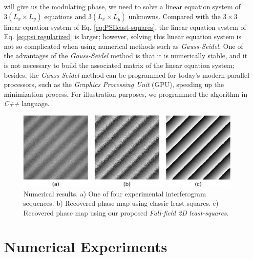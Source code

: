 will give us the modulating phase, we need to solve a linear equation
system of $3(L_x\times L_y)$ equations and $3(L_x\times L_y)$
unknowns. Compared with the $3\times 3$ linear equation system of
Eq. \eqref{eq:PSIleast-squares}, the linear equation system of
Eq. \eqref{eq:psi regularized} is larger; however, solving this
linear equation system is not so complicated when using numerical
methods such as \emph{Gauss-Seidel}. One of the advantages of
the \emph{Gauss-Seidel} method is that it is numerically stable, and
it is not necessary to build the associated matrix of the linear
equation system; besides, the \emph{Gauss-Seidel} method can be
programmed for today's modern parallel processors, such as the
\emph{Graphics Processing Unit} (GPU), speeding up the minimization
process. For illustration purposes, we programmed the algorithm in
\emph{C++} language.
\begin{figure}[th!]
	\begin{center}
		\includegraphics[scale=0.25]{Chpt1_figures/Fig_1.eps}
	\end{center}
	\caption{Numerical results. a) One of four experimental 
	interferogram sequences. b) Recovered phase map using classic 
	least-squares. c) Recovered phase map using our proposed 
	\textit{Full-field 2D least-squares}.}
	\label{fig:SimPhaseComparison}
\end{figure}
\section{Numerical Experiments}


